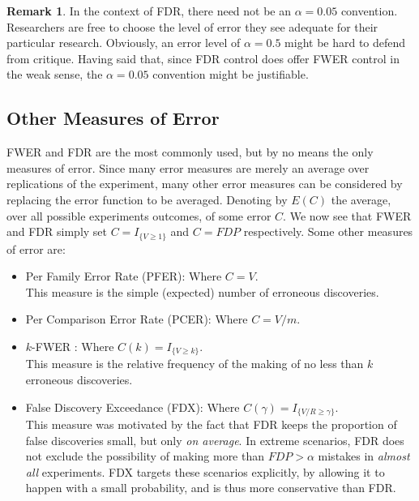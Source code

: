 \documentclass[review,12pt]{article}
\theoremstyle{definition}
\theoremstyle{definition}
\newtheorem{remark}{Remark}[section]
\begin{document}
\begin{remark}
In the context of FDR, there need not be an $\alpha=0.05$ convention. Researchers are free to choose the level of error they see adequate for their particular research. Obviously, an error level of $\alpha=0.5$ might be hard to defend from critique. Having said that, since FDR control does offer FWER control in the weak sense, the $\alpha=0.05$ convention might be justifiable.
\end{remark}




\subsection{\label{sec:other_measures}Other Measures of Error}
FWER and FDR are the most commonly used, but by no means the only measures of error. Since many error measures are merely an average over replications of the experiment, many other error measures can be considered by replacing the error function to be averaged. Denoting by $E(C)$ the average, over all possible experiments outcomes, of some error $C$. We now see that FWER and FDR simply set  $C = I_{\{ V \geq 1 \} } $ and $C = FDP$ respectively.
Some other measures of error are:



\begin{itemize}

\item Per Family Error Rate (PFER): Where $C=V$.\\
This measure is the simple (expected) number of erroneous discoveries. 

\item Per Comparison Error Rate (PCER): Where $C=V/m$.

\item $k$-FWER \citep{van_der_laan_augmentation_2004}: Where $C(k) = I_{\{ V \geq k \} }$.\\
This measure is the relative frequency of the making of no less than $k$ erroneous discoveries.

\item False Discovery Exceedance (FDX)\citep{genovese_exceedance_2006}: Where $C(\gamma) = I_{\{ V/R \geq \gamma \} }$.\\
This measure was motivated by the fact that FDR keeps the proportion of false discoveries small, but only \emph{on average}. 
In extreme scenarios, FDR does not exclude the possibility of making more than $FDP>\alpha$ mistakes in \emph{almost all} experiments. FDX targets these scenarios explicitly, by allowing it to happen with a small probability, and is thus more conservative than FDR. 

\end{itemize}
\end{document}
